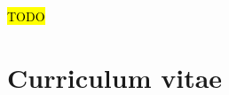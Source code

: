 \documentclass[COG,11pt]{ercgrant}
\begin{document}


 \hl{TODO}




\begin{small}
\printbibliography
\end{small}

% 	
% 	

\newpage
\section{Curriculum vitae}
\end{document}
